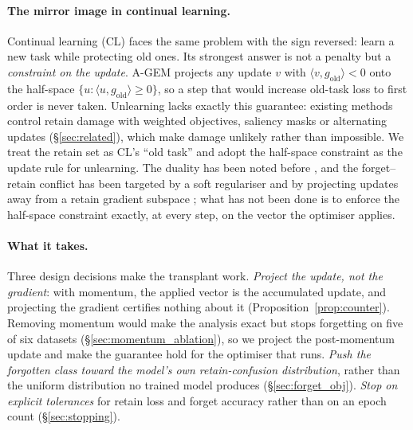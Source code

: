 \documentclass{article}
\newcommand{\added}[1]{{\color{revised}#1}}
\theoremstyle{remark}
\theoremstyle{plain}
\begin{document}
\paragraph{The mirror image in continual learning.}
Continual learning (CL) faces the same problem with the sign reversed: learn a
new task while protecting old ones. Its strongest answer is not a penalty but a
\emph{constraint on the update}. A-GEM \citep{chaudhry2019agem} projects any
update $v$ with $\langle v, g_{\text{old}}\rangle < 0$ onto the half-space
$\{u : \langle u, g_{\text{old}}\rangle \ge 0\}$, so a step that would increase
old-task loss to first order is never taken. Unlearning lacks exactly this
guarantee: existing methods control retain damage with weighted objectives,
saliency masks or alternating updates (\S\ref{sec:related}), which make damage
unlikely rather than impossible. We treat the retain set as CL's ``old task'' and
adopt the half-space constraint as the update rule for unlearning. The duality
has been noted before \citep{kurmanji2023unbounded,nguyen2020variational}, and
the forget--retain conflict has been targeted by a soft regulariser
\citep{patel2025learning}\added{ and by projecting updates away from a retain
gradient subspace \citep{hoang2024learn}}; what has not been done is to enforce
the half-space constraint exactly, at every step, on the vector the optimiser
applies.

\paragraph{What it takes.}
Three design decisions make the transplant work. \emph{Project the update, not
the gradient}: with momentum, the applied vector is the accumulated update, and
projecting the gradient certifies nothing about it
(Proposition~\ref{prop:counter}). Removing momentum would make the analysis
exact but stops forgetting on five of six datasets
(\S\ref{sec:momentum_ablation}), so we project the post-momentum update and make
the guarantee hold for the optimiser that runs. \emph{Push the forgotten class
toward the model's own retain-confusion distribution}, rather than the uniform
distribution no trained model produces (\S\ref{sec:forget_obj}). \emph{Stop on
explicit tolerances} for retain loss and forget accuracy rather than on an epoch
count (\S\ref{sec:stopping}).
\end{document}
